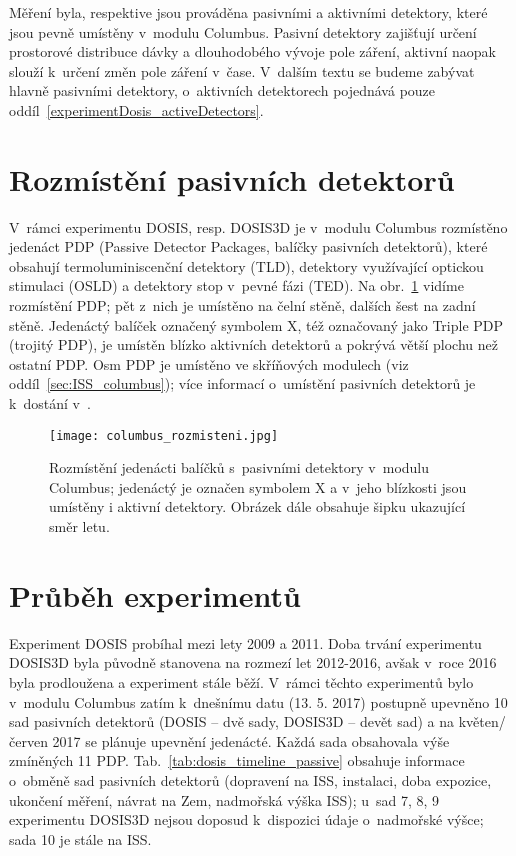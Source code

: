 Měření byla, respektive jsou prováděna pasivními a aktivními detektory, které jsou pevně umístěny v~modulu Columbus. Pasivní detektory zajišťují určení prostorové distribuce dávky a dlouhodobého vývoje pole záření, aktivní naopak slouží k~určení změn pole záření v~čase. V~dalším textu se budeme zabývat hlavně pasivními detektory, o~aktivních detektorech pojednává pouze oddíl~\ref{experimentDosis_activeDetectors}.

\section{Rozmístění pasivních detektorů}
V~rámci experimentu DOSIS, resp. DOSIS3D je v~modulu Columbus rozmístěno jedenáct PDP (Passive Detector Packages, balíčky pasivních detektorů), které obsahují termoluminiscenční detektory (TLD), detektory využívající optickou stimulaci (OSLD) a detektory stop v~pevné fázi (TED). Na obr.~\ref{fig:columbus_rozmisteni} vidíme rozmístění PDP; pět z~nich je umístěno na čelní stěně, dalších šest na zadní stěně. Jedenáctý balíček označený symbolem X, též označovaný jako Triple PDP (trojitý PDP), je umístěn blízko aktivních detektorů a pokrývá větší plochu než ostatní PDP. Osm PDP je umístěno ve skříňových modulech (viz oddíl~\ref{sec:ISS_columbus}); více informací o~umístění pasivních detektorů je k~dostání v~\cite{dosis}. %
\begin{figure}[ht]
  \centering
  \texttt{[image: columbus\_rozmisteni.jpg]}
  \caption{Rozmístění jedenácti balíčků s~pasivními detektory v~modulu Columbus; jedenáctý je označen symbolem X a v~jeho blízkosti jsou umístěny i aktivní detektory. Obrázek dále obsahuje šipku ukazující směr letu. \cite{dosis}}
  \label{fig:columbus_rozmisteni}
\end{figure}

\section{Průběh experimentů}%
Experiment DOSIS probíhal mezi lety 2009 a 2011. Doba trvání experimentu DOSIS3D byla původně stanovena na rozmezí let 2012-2016, avšak v~roce 2016 byla prodloužena a experiment stále běží. V~rámci těchto experimentů bylo v~modulu Columbus zatím k~dnešnímu datu (13. 5. 2017) postupně upevněno 10 sad pasivních detektorů (DOSIS -- dvě sady, DOSIS3D -- devět sad) a na květen/červen 2017 se plánuje upevnění jedenácté. Každá sada obsahovala výše zmíněných 11 PDP. Tab.~\ref{tab:dosis_timeline_passive} obsahuje informace o~obměně sad pasivních detektorů (dopravení na ISS, instalaci, doba expozice, ukončení měření,
návrat na Zem, nadmořská výška ISS); u~sad 7, 8, 9 experimentu DOSIS3D nejsou doposud k~dispozici údaje o~nadmořské výšce; sada 10 je stále na ISS. 

